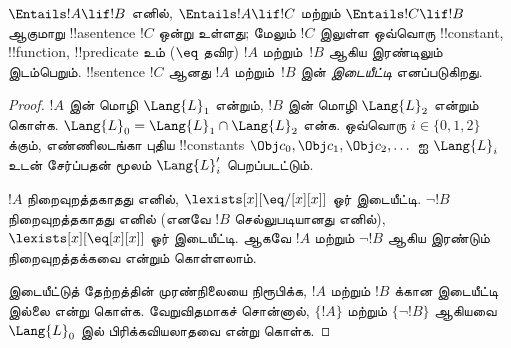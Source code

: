 \documentclass[../../../include/open-logic-section]{subfiles}
\begin{document}



\begin{thm}[கிரெய்கின் இடையீட்டுத் தேற்றம்]
$\Entails !A \lif !B$ எனில், $\Entails !A \lif !C$ மற்றும்
$\Entails !C \lif !B$ ஆகுமாறு !!a{sentence} $!C$ ஒன்று உள்ளது;
மேலும் $!C$ இலுள்ள ஒவ்வொரு !!{constant}, !!{function},
!!{predicate} உம் ($\eq$ தவிர) $!A$ மற்றும்~$!B$ ஆகிய இரண்டிலும்
இடம்பெறும். !!{sentence} $!C$ ஆனது $!A$ மற்றும்~$!B$ இன்
\emph{இடையீட்டி} எனப்படுகிறது.
\end{thm}

\begin{proof}
$!A$ இன் மொழி $\Lang{L}_1$ என்றும், $!B$ இன் மொழி $\Lang{L}_2$
என்றும் கொள்க. $\Lang{L}_0 = \Lang{L}_1 \cap \Lang{L}_2$ என்க.
ஒவ்வொரு $i \in \{0, 1, 2 \}$ க்கும், எண்ணிலடங்கா புதிய
!!{constant}s $\Obj c_0,
\Obj c_1, \Obj c_2, \dots$ ஐ $\Lang{L}_i$ உடன் சேர்ப்பதன் மூலம்
$\Lang{L}'_i$ பெறப்படட்டும்.

$!A$ நிறைவுறத்தகாதது எனில், $\lexists[x][\eq/[x][x]]$ ஓர் இடையீட்டி.
$\lnot !B$ நிறைவுறத்தகாதது எனில் (எனவே $!B$ செல்லுபடியானது எனில்),
$\lexists[x][\eq[x][x]]$ ஓர் இடையீட்டி. ஆகவே $!A$ மற்றும்
$\lnot !B$ ஆகிய இரண்டும் நிறைவுறத்தக்கவை என்றும் கொள்ளலாம்.

இடையீட்டுத் தேற்றத்தின் முரண்நிலையை நிரூபிக்க, $!A$ மற்றும் $!B$
க்கான இடையீட்டி இல்லை என்று கொள்க. வேறுவிதமாகச் சொன்னால்,
$\{!A\}$ மற்றும் $\{\lnot !B\}$ ஆகியவை $\Lang{L}_0$ இல்
பிரிக்கவியலாதவை என்று கொள்க.


\end{proof}
\end{document}
